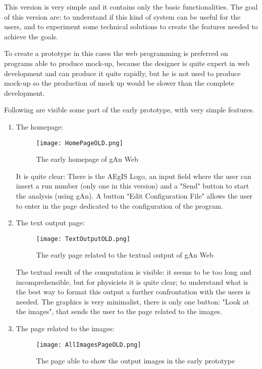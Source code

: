 This version is very simple and it contains only the basic functionalities. 
The goal of this version are: to understand if this kind of system can be useful for the users, and to experiment some technical solutions to create the features needed to achieve the goals. 

To create a prototype in this cases the web programming is preferred on programs able to produce mock-up, because the designer is quite expert in web development
and can produce it quite rapidly, but he is not used to produce mock-up so the production of mock up would be slower than the complete development. 


Following are visible some part of the early prototype, with very simple features.

\begin{enumerate}
\item The homepage:

\begin{figure}[H]
\centering
\texttt{[image: HomePageOLD.png]} 
\caption{The early homepage of gAn Web}
\end{figure}

It is quite clear: There is the AEgIS Logo, an input field where the user can insert a run number (only one in this version) and a "Send" button to start the analysis (using gAn). A button "Edit Configuration File" allows the user to  enter in the page dedicated to the configuration of the program.

\item The text output page:

\begin{figure}[H]
\centering
\texttt{[image: TextOutputOLD.png]} 
\caption{The early page related to the textual output of gAn Web}
\end{figure}
  
The textual result of the computation is visible: it seems to be too long and incomprehensible, but for physicists it is quite clear; to understand what is the best way to format this output a further confrontation with the users is needed. The graphics is very minimalist, there is only one button: "Look at the images", that sends the user to the page related to the images. 



\item The page related to the images:

\begin{figure}[H]
\centering
\texttt{[image: AllImagesPageOLD.png]}
\caption{The page able to show the output images in the early prototype}
\end{figure}   


\end{enumerate}
